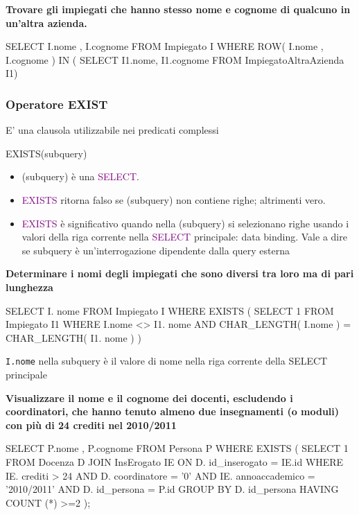 \textbf{\large Trovare gli impiegati che hanno stesso nome e cognome di qualcuno in 
un’altra azienda.}
\begin{codiceSQL}
SELECT I.nome , I.cognome
FROM Impiegato I
WHERE ROW( I.nome , I.cognome ) IN (
SELECT I1.nome, I1.cognome FROM ImpiegatoAltraAzienda I1)
\end{codiceSQL}



\subsubsection{Operatore EXIST}
E’ una clausola utilizzabile nei predicati complessi
\begin{codiceSQL}
  EXISTS(subquery)
\end{codiceSQL}


\begin{itemize}
  \item (subquery) è una \textcolor{purple}{SELECT}.
  \item \textcolor{purple}{EXISTS} ritorna falso se (subquery) non contiene righe; altrimenti vero.
  \item \textcolor{purple}{EXISTS} è significativo quando nella (subquery) si selezionano righe usando i 
valori della riga corrente nella \textcolor{purple}{SELECT} principale: \textcolor{black!60!red}{data binding. 
Vale a dire se subquery è un'interrogazione dipendente dalla query esterna}
\end{itemize}


\textbf{\large Determinare i nomi degli impiegati che sono diversi tra loro ma di pari 
lunghezza}

\begin{codiceSQL}
  SELECT I. nome
FROM Impiegato I
WHERE EXISTS (
  SELECT 1 
  FROM Impiegato I1 
  WHERE I.nome <> I1. nome AND CHAR_LENGTH( I.nome ) = CHAR_LENGTH( I1. nome )
)
\end{codiceSQL}
\texttt{I.nome} nella subquery è il valore di nome nella riga corrente della SELECT 
principale




\textbf{\large Visualizzare il nome e il cognome dei docenti, escludendo i coordinatori, che hanno 
tenuto almeno due insegnamenti (o moduli) con più di 24 crediti nel 2010/2011}

\begin{codiceSQL}
  SELECT P.nome , P.cognome
FROM Persona P
WHERE EXISTS (
SELECT 1 
FROM Docenza D 
  JOIN InsErogato IE ON D. id_inserogato = IE.id
WHERE IE. crediti > 24 AND D. coordinatore = '0'
AND IE. annoaccademico = '2010/2011' AND D. id_persona = P.id
GROUP BY D. id_persona
HAVING COUNT (*) >=2
);

\end{codiceSQL}

